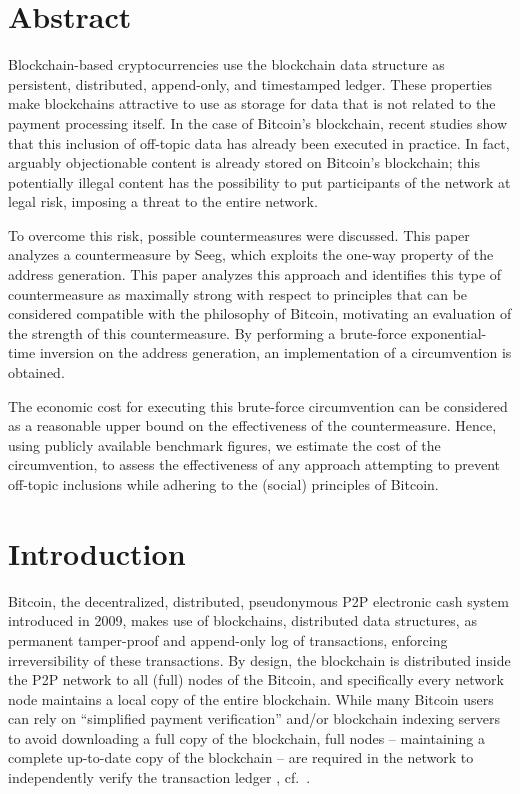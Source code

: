\documentclass[a4paper,11pt,titlepage]{scrbook}
\newcommand{\blankpage}{
 \clearpage{\pagestyle{empty}\cleardoublepage}
}
\begin{document}
\frontmatter
{}

\setmarginsrb{3cm}{1cm}{3cm}{1cm}{6mm}{7mm}{5mm}{15mm}
\chapter*{Abstract}
Blockchain-based cryptocurrencies use the blockchain data structure as persistent, distributed, append-only, and timestamped ledger.
These properties make blockchains attractive to use as storage for data that is not related to the payment processing itself.
In the case of Bitcoin's blockchain, recent studies show that this inclusion of off-topic data has already been executed in practice.
In fact, arguably objectionable content is already stored on Bitcoin's blockchain;
this potentially illegal content has the possibility to put participants of the network at legal risk, imposing a threat to the entire network.

To overcome this risk, possible countermeasures were discussed. This paper analyzes a countermeasure by Seeg, which exploits the one-way property of the address generation.
This paper analyzes this approach and identifies this type of countermeasure as maximally strong with respect to principles that can be considered compatible with the philosophy of Bitcoin, motivating an evaluation of the strength of this countermeasure.
By performing a brute-force exponential-time inversion on the address generation, an implementation of a circumvention is obtained.

The economic cost for executing this brute-force circumvention can be considered as a reasonable upper bound on the effectiveness of the countermeasure.
Hence, using publicly available benchmark figures, we estimate the cost of the circumvention, to assess the effectiveness of any approach attempting to prevent off-topic inclusions while adhering to the (social) principles of Bitcoin.





\tableofcontents
\blankpage

\mainmatter
{}
\chapter{Introduction}

Bitcoin, the decentralized, distributed, pseudonymous P2P electronic cash system introduced in 2009, makes use of blockchains, distributed data structures, as permanent tamper-proof and append-only log of transactions, enforcing irreversibility of these transactions.
By design, the blockchain is distributed inside the P2P network to all (full) nodes of the Bitcoin, and specifically every network node maintains a local copy of the entire blockchain.
While many Bitcoin users can rely on \enquote{simplified payment verification} and/or blockchain indexing servers to avoid downloading a full copy of the blockchain, full nodes – maintaining a complete up-to-date copy of the blockchain – are required in the network to independently verify the transaction ledger \cite{nakamoto_bitcoin_2008}, cf.~\cite[Chap.~8–9]{antonopoulos_mastering_2017}.
\end{document}
